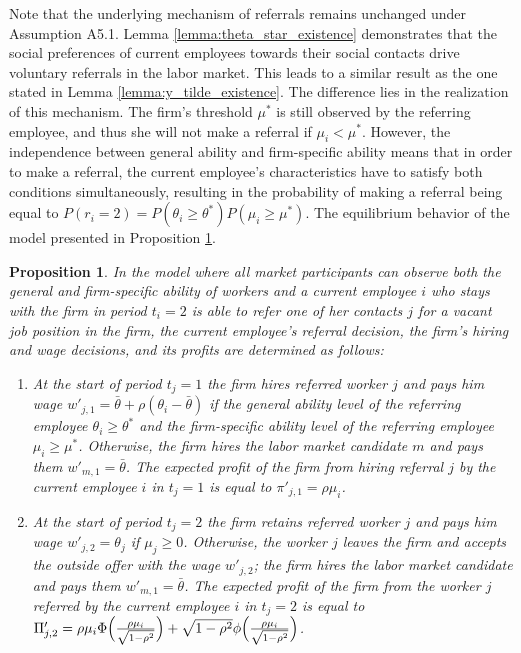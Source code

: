 \documentclass[12pt]{article}
\newtheorem{proposition}{Proposition}
\begin{document}
Note that the underlying mechanism of referrals remains unchanged under Assumption A5.1. Lemma \ref{lemma:theta_star_existence} demonstrates that the social preferences of current employees towards their social contacts drive voluntary referrals in the labor market. This leads to a similar result as the one stated in Lemma \ref{lemma:y_tilde_existence}. The difference lies in the realization of this mechanism. The firm's threshold $\mu^*$ is still observed by the referring employee, and thus she will not make a referral if $\mu_i < \mu^*$. However, the independence between general ability and firm-specific ability means that in order to make a referral, the current employee's characteristics have to satisfy both conditions simultaneously, resulting in the probability of making a referral being equal to $P(r_i = 2) = P(\theta_i \geq \theta^*)P(\mu_i \geq \mu^*)$. The equilibrium behavior of the model presented in Proposition \ref{prop:ext_eq_vr}.
\begin{proposition}\label{prop:ext_eq_vr}
    In the model where all market participants can observe both the general and firm-specific ability of workers and a current employee $i$ who stays with the firm in period $t_i = 2$ is able to refer one of her contacts $j$ for a vacant job position in the firm, the current employee's referral decision, the firm’s hiring and wage decisions, and its profits are determined as follows:
    \begin{enumerate}[label={\roman*})]
		\item At the start of period $t_j = 1$ the firm hires referred worker $j$ and pays him wage $w'_{j,1} = \bar{\theta}+\rho\left(\theta_i - \bar{\theta}\right)$ if the general ability level of the referring employee $\theta_i \geq \theta^*$ and the firm-specific ability level of the referring employee $\mu_i \geq \mu^*$. Otherwise, the firm hires the labor market candidate $m$ and pays them $w'_{m,1} = \bar{\theta}$. The expected profit of the firm from hiring referral $j$ by the current employee $i$ in $t_j = 1$ is equal to $\pi'_{j,1} = \rho\mu_i$.
        \item At the start of period $t_j = 2$ the firm retains referred worker $j$ and pays him wage $w'_{j,2} = \theta_j$ if $\mu_j \geq 0$. Otherwise, the worker $j$ leaves the firm and accepts the outside offer with the wage $w'_{j,2}$; the firm hires the labor market candidate and pays them $w'_{m,1} = \bar{\theta}$. The expected profit of the firm from the worker $j$ referred by the current employee $i$ in $t_j = 2$ is equal to $\Pi'_{j,2} = \rho\mu_i \Phi \Bigl(\frac{\rho\mu_i}{\sqrt{1-\rho^2}} \Bigr) + \sqrt{1-\rho^2}\phi \Bigl(\frac{\rho\mu_i}{\sqrt{1-\rho^2}} \Bigr)$.
	\end{enumerate}
\end{proposition}
\end{document}
